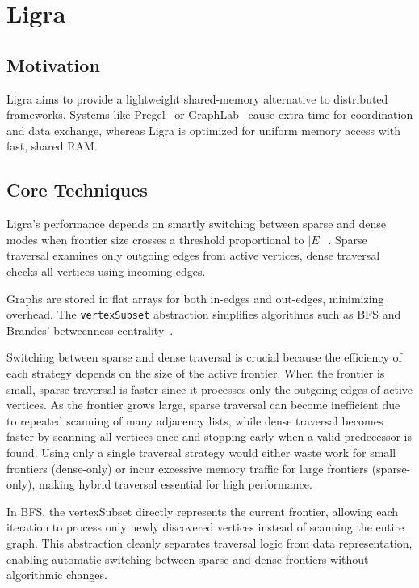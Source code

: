 \documentclass[a4paper,USenglish]{lipics-v2021}
\begin{document}
\section{Ligra}

\subsection{Motivation}
Ligra aims to provide a lightweight shared-memory alternative to distributed frameworks. Systems like Pregel~\cite{malewicz2010pregel} or GraphLab~\cite{low2010graphlab} cause extra time for coordination and data exchange, whereas Ligra is optimized for uniform memory access with fast, shared RAM.

\subsection{Core Techniques}
Ligra’s performance depends on smartly switching between sparse and dense modes when frontier size crosses a threshold proportional to $|E|$~\cite{shun2013ligra}. Sparse traversal examines only outgoing edges from active vertices, dense traversal checks all vertices using incoming edges.

Graphs are stored in flat arrays for both in-edges and out-edges, minimizing overhead. The \texttt{vertexSubset} abstraction simplifies algorithms such as BFS and Brandes' betweenness centrality~\cite{brandes2001faster}.

Switching between sparse and dense traversal is crucial because the efficiency of each strategy depends on the size of the active frontier. When the frontier is small, sparse traversal is faster since it processes only the outgoing edges of active vertices. As the frontier grows large, sparse traversal can become inefficient due to repeated scanning of many adjacency lists, while dense traversal becomes faster by scanning all vertices once and stopping early when a valid predecessor is found. Using only a single traversal strategy would either waste work for small frontiers (dense-only) or incur excessive memory traffic for large frontiers (sparse-only), making hybrid traversal essential for high performance.

In BFS, the vertexSubset directly represents the current frontier, allowing each iteration to process only newly discovered vertices instead of scanning the entire graph. This abstraction cleanly separates traversal logic from data representation, enabling automatic switching between sparse and dense frontiers without algorithmic changes.
\end{document}
